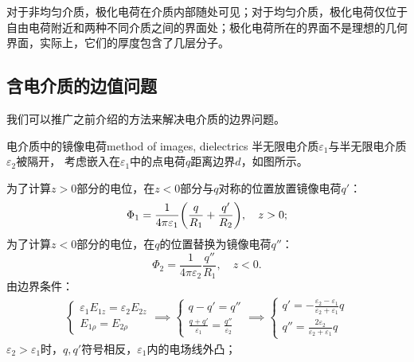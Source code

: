 对于非均匀介质，极化电荷在介质内部随处可见；对于均匀介质，极化电荷仅位于自由电荷附近和两种不同介质之间的界面处；极化电荷所在的界面不是理想的几何界面，实际上，它们的厚度包含了几层分子。

\subsection{含电介质的边值问题}
\label{ssec:boundary-value problem with dielectrics}

我们可以推广之前介绍的方法来解决电介质的边界问题。
\begin{example}{电介质中的镜像电荷}{method of images, dielectrics}
    半无限电介质$\varepsilon_1$与半无限电介质$\varepsilon_2$被隔开，
    考虑嵌入在$\varepsilon_1$中的点电荷$q$距离边界$d$，如图所示。
    \begin{center}
    \end{center}
    为了计算$z>0$部分的电位，在$z<0$部分与$q$对称的位置放置镜像电荷$q'$：
    \[
        \Phi_1=\frac1{4\pi\varepsilon_1}\biggl(\frac q{R_1}+\frac{q'}{R_2}\biggr),\quad z>0;
    \]
    为了计算$z<0$部分的电位，在$q$的位置替换为镜像电荷$q''$：
    \[
        \Phi_2=\frac1{4\pi\varepsilon_2}\frac{q''}{R_1},\quad z<0.
    \]
    由边界条件： 
    \begin{align*}
        \begin{cases}
            \varepsilon_1E_{1z}=\varepsilon_2E_{2z}\\
            E_{1\rho}=E_{2\rho}
        \end{cases}\implies
        \begin{cases}
            q-q'=q''\\
            \frac{q+q'}{\varepsilon_1}=\frac{q''}{\varepsilon_2}
        \end{cases}\implies
        \begin{cases}
            q'=-\frac{\varepsilon_2-\varepsilon_1}{\varepsilon_2+\varepsilon_1}q\\[1ex]
            q''=\frac{2\varepsilon_2}{\varepsilon_2+\varepsilon_1}q
        \end{cases}
    \end{align*}
    $\varepsilon_2>\varepsilon_1$时，$q,q'$符号相反，$\varepsilon_1$内的电场线外凸；
    

\end{example}
